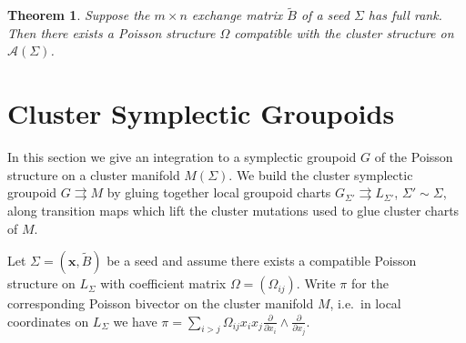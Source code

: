 \documentclass{amsart}
\newtheorem{theorem}{Theorem}[section]
\newcommand{\bfx}{\mathbf{x}}
\newcommand{\cA}{\mathcal{A}}
\begin{document}
\begin{theorem}
  \cite{gekhtman-shapiro-vainshtein}
  Suppose the $m\times n$ exchange matrix $\tilde B$ of a seed $\Sigma$ has full rank.  Then there exists a Poisson structure $\Omega$ compatible with the cluster structure on $\cA(\Sigma)$.
\end{theorem}


\section{Cluster Symplectic Groupoids}
In this section we give an integration to a symplectic groupoid $G$ of the Poisson structure on a cluster manifold $M(\Sigma)$.  
We build the cluster symplectic groupoid $G\rightrightarrows M$ by gluing together local groupoid charts $G_{\Sigma'}\rightrightarrows L_{\Sigma'}$, $\Sigma'\sim\Sigma$, along transition maps which lift the cluster mutations used to glue cluster charts of $M$.

Let $\Sigma=(\bfx,\tilde B)$ be a seed and assume there exists a compatible Poisson structure on $L_\Sigma$ with coefficient matrix $\Omega=(\Omega_{ij})$.  
Write $\pi$ for the corresponding Poisson bivector on the cluster manifold $M$, i.e.\ in local coordinates on $L_\Sigma$ we have $\pi=\sum\limits_{i>j}\Omega_{ij}x_ix_j\frac{\partial}{\partial x_i}\wedge\frac{\partial}{\partial x_j}$.
\end{document}
